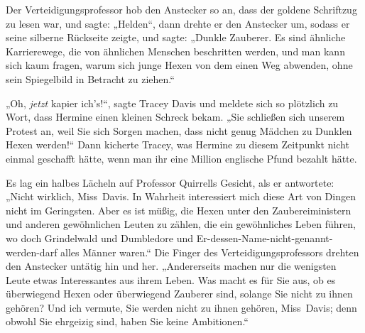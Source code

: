Der Verteidigungsprofessor hob den Anstecker so an, dass der goldene Schriftzug \SPHEW zu lesen war, und sagte: „Helden“, dann drehte er den Anstecker um, sodass er seine silberne Rückseite zeigte, und sagte: „Dunkle Zauberer. Es sind ähnliche Karrierewege, die von ähnlichen Menschen beschritten werden, und man kann sich kaum fragen, warum sich junge Hexen von dem einen Weg abwenden, ohne sein Spiegelbild in Betracht zu ziehen.“

„Oh, \emph{jetzt} kapier ich’s!“, sagte Tracey Davis und meldete sich so plötzlich zu Wort, dass Hermine einen kleinen Schreck bekam. „Sie schließen sich unserem Protest an, weil Sie sich Sorgen machen, dass nicht genug Mädchen zu Dunklen Hexen werden!“ Dann kicherte Tracey, was Hermine zu diesem Zeitpunkt nicht einmal geschafft hätte, wenn man ihr eine Million englische Pfund bezahlt hätte.

Es lag ein halbes Lächeln auf Professor Quirrells Gesicht, als er antwortete: „Nicht wirklich, Miss~Davis. In Wahrheit interessiert mich diese Art von Dingen nicht im Geringsten. Aber es ist müßig, die Hexen unter den Zaubereiministern und anderen gewöhnlichen Leuten zu zählen, die ein gewöhnliches Leben führen, wo doch Grindelwald und Dumbledore und Er-dessen-Name-nicht-genannt-werden-darf alles Männer waren.“ Die Finger des Verteidigungsprofessors drehten den Anstecker untätig hin und her. „Andererseits machen nur die wenigsten Leute etwas Interessantes aus ihrem Leben. Was macht es für Sie aus, ob es überwiegend Hexen oder überwiegend Zauberer sind, solange Sie nicht zu ihnen gehören? Und ich vermute, Sie werden nicht zu ihnen gehören, Miss~Davis; denn obwohl Sie ehrgeizig sind, haben Sie keine Ambitionen.“

